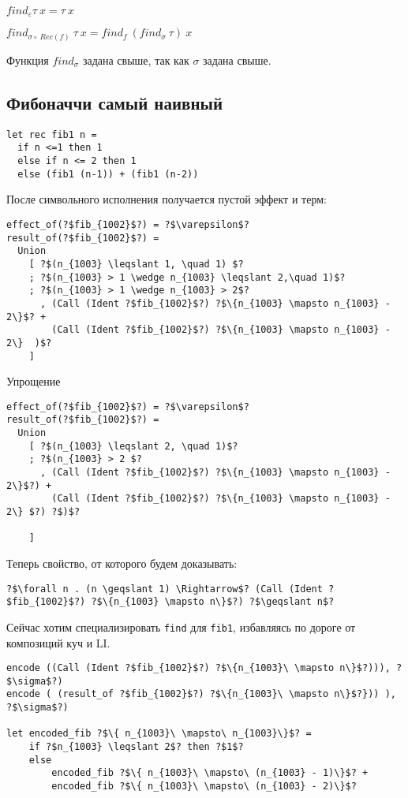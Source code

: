 \documentclass[a5paper,12pt]{article}
\begin{document}
$find_{\varepsilon} \tau\ x = \tau\ x$

$find_{\sigma\circ\ Rec(f)}\ \tau\ x = find_{f}\ (find_{\sigma}\ \tau)\ x$

Функция $find_\sigma$ задана свыше, так как $\sigma$ задана свыше.

\subsection{Фибоначчи самый наивный}
\begin{verbatim}  
let rec fib1 n = 
  if n <=1 then 1
  else if n <= 2 then 1
  else (fib1 (n-1)) + (fib1 (n-2))
\end{verbatim}

После символьного исполнения получается пустой эффект и терм:
\begin{verbatim}
effect_of(?$fib_{1002}$?) = ?$\varepsilon$?
result_of(?$fib_{1002}$?) = 
  Union 
    [ ?$(n_{1003} \leqslant 1, \quad 1) $?
    ; ?$(n_{1003} > 1 \wedge n_{1003} \leqslant 2,\quad 1)$?
    ; ?$(n_{1003} > 1 \wedge n_{1003} > 2$?
      , (Call (Ident ?$fib_{1002}$?) ?$\{n_{1003} \mapsto n_{1003} - 2\}$? +
        (Call (Ident ?$fib_{1002}$?) ?$\{n_{1003} \mapsto n_{1003} - 2\}  )$?   
    ]
\end{verbatim}
Упрощение
\begin{verbatim}
effect_of(?$fib_{1002}$?) = ?$\varepsilon$?
result_of(?$fib_{1002}$?) = 
  Union 
    [ ?$(n_{1003} \leqslant 2, \quad 1)$?
    ; ?$(n_{1003} > 2 $?
      , (Call (Ident ?$fib_{1002}$?) ?$\{n_{1003} \mapsto n_{1003} - 2\}$?) +
        (Call (Ident ?$fib_{1002}$?) ?$\{n_{1003} \mapsto n_{1003} - 2\} $?) ?$)$?

    ]
\end{verbatim}
Теперь свойство, от которого будем доказывать: 
\begin{verbatim}
?$\forall n . (n \geqslant 1) \Rightarrow$? (Call (Ident ?$fib_{1002}$?) ?$\{n_{1003} \mapsto n\}$?) ?$\geqslant n$?
\end{verbatim}

Сейчас хотим специализировать \texttt{find} для \texttt{fib1}, избавляясь по дороге от композиций куч и LI.

\begin{verbatim}
encode ((Call (Ident ?$fib_{1002}$?) ?$\{n_{1003}\ \mapsto n\}$?))), ?$\sigma$?)
encode ( (result_of ?$fib_{1002}$?) ?$\{n_{1003}\ \mapsto n\}$?})) ), ?$\sigma$?)

let encoded_fib ?$\{ n_{1003}\ \mapsto\ n_{1003}\}$? = 
    if ?$n_{1003} \leqslant 2$? then ?$1$?
    else 
        encoded_fib ?$\{ n_{1003}\ \mapsto\ (n_{1003} - 1)\}$? +  
        encoded_fib ?$\{ n_{1003}\ \mapsto\ (n_{1003} - 2)\}$?
\end{verbatim}
\end{document}

